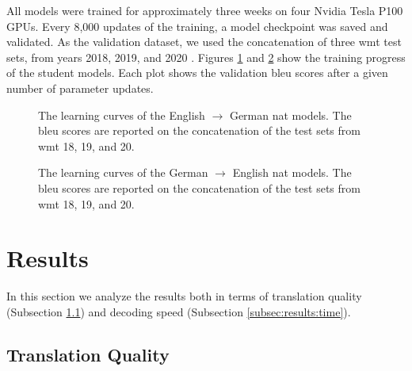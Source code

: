 All models were trained for approximately three weeks on four Nvidia Tesla P100
GPUs. Every 8,000 updates of the training, a model checkpoint was saved and
validated. As the validation dataset, we used the concatenation of three
\ac{wmt} test sets, from years 2018, 2019, and 2020
\citep{bojar-etal-2018-findings, barrault-etal-2019-findings,
  barrault-etal-2020-findings}.  Figures \ref{fig:ende-learning-curves} and
\ref{fig:deen-learning-curves} show the training progress of the student
models. Each plot shows the validation \acs{bleu} scores after a given number
of parameter updates.

\begin{figure}
  \centering
  

  \caption{The learning curves of the English $\rightarrow$ German \ac{nat}
    models. The \acs{bleu} scores are reported on the concatenation of the test
    sets from \acs{wmt} 18, 19, and 20.}%
  \label{fig:ende-learning-curves}
\end{figure}

\begin{figure}
  \centering
  

  \caption{The learning curves of the German $\rightarrow$ English \ac{nat}
    models. The \acs{bleu} scores are reported on the concatenation of the test
    sets from \acs{wmt} 18, 19, and 20.}%
  \label{fig:deen-learning-curves}
\end{figure}


\section{Results}%
\label{sec:exp:results}

In this section we analyze the results both in terms of translation quality
(Subsection \ref{subsec:results:quality}) and decoding speed (Subsection
\ref{subsec:results:time}).


\subsection{Translation Quality}%
\label{subsec:results:quality}

